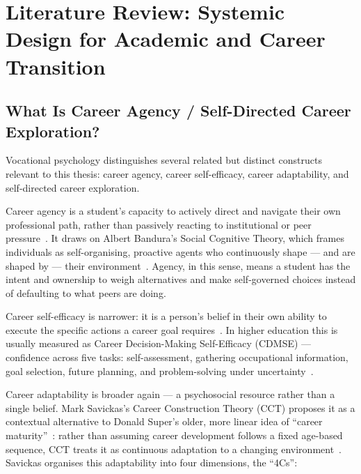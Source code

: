 
\chapter{Literature Review: Systemic Design for Academic and Career Transition}\doublespacing

\label{Chapter2}


\section{What Is Career Agency / Self-Directed Career Exploration?}

Vocational psychology distinguishes several related but distinct constructs relevant to this thesis: career agency, career self-efficacy, career adaptability, and self-directed career exploration.

Career agency is a student's capacity to actively direct and navigate their own professional path, rather than passively reacting to institutional or peer pressure~\cite{Taber-2015}. It draws on Albert Bandura's Social Cognitive Theory, which frames individuals as self-organising, proactive agents who continuously shape --- and are shaped by --- their environment~\cite{Bandura-1986}. Agency, in this sense, means a student has the intent and ownership to weigh alternatives and make self-governed choices instead of defaulting to what peers are doing.

Career self-efficacy is narrower: it is a person's belief in their own ability to execute the specific actions a career goal requires~\cite{Bandura-1986}. In higher education this is usually measured as Career Decision-Making Self-Efficacy (CDMSE) --- confidence across five tasks: self-assessment, gathering occupational information, goal selection, future planning, and problem-solving under uncertainty~\cite{Hackett-1981}.

Career adaptability is broader again --- a psychosocial resource rather than a single belief. Mark Savickas's Career Construction Theory (CCT) proposes it as a contextual alternative to Donald Super's older, more linear idea of ``career maturity''~\cite{Taber-2015, Wang-2024-CCT, Savickas-2013}: rather than assuming career development follows a fixed age-based sequence, CCT treats it as continuous adaptation to a changing environment~\cite{Savickas-2013, Savickas-2012}. Savickas organises this adaptability into four dimensions, the ``4Cs'':

